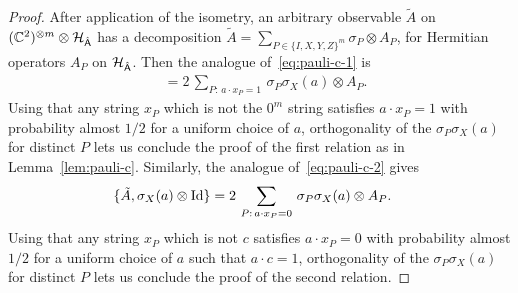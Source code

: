\begin{proof}
After application of the isometry, an arbitrary observable $\tilde{A}$ on  $(\mathbb{C}^2)^{\otimes m} \otimes \mathcal{H}_{\hat{{\textsf{A}}}}$ has a decomposition $\tilde{A} = \sum_{P\in\{I,X,Y,Z\}^m} \sigma_P \otimes A_P$, for Hermitian operators $A_P$ on $\mathcal{H}_{\hat{{\textsf{A}}}}$. 
 Then the analogue of~\eqref{eq:pauli-c-1} is
\begin{align*}
[\tilde{A},\sigma_X(a)\otimes \Id] &= 2 \,\sum_{P:\,a\cdot x_P=1} \,\sigma_P\sigma_X(a) \otimes A_P.
\end{align*} 
Using that any string $x_P$ which is not the $0^m$ string satisfies $a\cdot x_P = 1$ with probability almost $1/2$ for a uniform choice of $a$, orthogonality of the $\sigma_P\sigma_X(a) $ for distinct $P$ lets us conclude the proof of the first relation as in Lemma~\ref{lem:pauli-c}. Similarly, the analogue of~\eqref{eq:pauli-c-2} gives
\begin{align*}
\{\tilde{A},\sigma_X(a)\otimes \mathop{\rm Id}\nolimits\} &= 2 \,\sum_{P:\,a\cdot x_P=0} \,\sigma_P\sigma_X(a) \otimes A_P.
\end{align*} 
Using that any string $x_P$ which is not $c$ satisfies $a\cdot x_P = 0$ with probability almost $1/2$ for a uniform choice of $a$ such that $a\cdot c=1$, orthogonality of the $\sigma_P\sigma_X(a) $ for distinct $P$ lets us conclude the proof of the second relation.
\end{proof}









